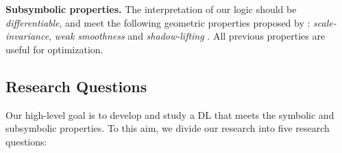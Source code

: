 \textbf{Subsymbolic properties.} The interpretation of our logic should be \emph{differentiable}, and meet the following geometric properties proposed by \mcita{}: \emph{scale-invariance}, \emph{weak smoothness} and \emph{shadow-lifting} \mcita{}. All previous properties are useful for optimization. %

\subsection{Research Questions}

Our high-level goal is to develop and study a DL that meets the symbolic and subsymbolic properties. To this aim, we divide our research into five research questions:

